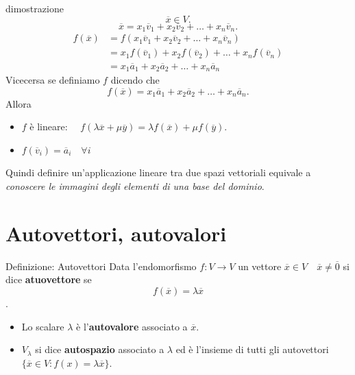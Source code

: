 \documentclass[x11names]{article}
\begin{document}
\begin{es}{dimostrazione}
\[
\overline{x} \in V
.\] 
\[
\overline{x} = x_1 \overline{v}_{1} + x_2\overline{v}_{2} + \dots + x_{n}\overline{v}_{n}
.\] 
\begin{align*}
	f\left(\overline{x}\right) &= f\left(x_1 \overline{v}_{1} + x_2\overline{v}_{2} + \dots + x_{n}\overline{v}_{n}\right) \\
				   &= x_1 f\left(\overline{v}_{1}\right) + x_2 f\left(\overline{v}_{2}\right) + \dots + x_{n}f\left(\overline{v}_{n}\right) \\
				   &= x_1 \overline{a}_{1} + x_2 \overline{a}_{2} + \dots + x_{n} \overline{a}_{n}
\end{align*}
Vicecersa se definiamo $f$ dicendo che 
\[
f\left(\overline{x}\right) = x_1 \overline{a}_{1} + x_2 \overline{a}_{2} + \dots + x_{n} \overline{a}_{n}
.\] 
Allora
\begin{itemize}
	\item $f$ è lineare: $\quad f\left(\lambda \overline{x} + \mu \overline{y}\right) = \lambda f\left(\overline{x}\right) + \mu f\left(\overline{y}\right)$.
	\item $f\left(\overline{v}_{i}\right) = \overline{a}_{i} \quad \forall i$
\end{itemize}
\end{es}


Quindi definire un'applicazione lineare tra due spazi vettoriali equivale a \textit{conoscere le immagini degli elementi di una base del dominio}.


\newpage
\section{Autovettori, autovalori}

\begin{center}
\colorbox{myblue}{\begin{minipage}{5.75in}
\begin{blues}{Definizione: Autovettori}
Data l'endomorfismo $f:V\rightarrow V$ un vettore $\overline{x} \in V \quad \overline{x} \neq \overline{0}$  si dice \textbf{atuovettore} se 
\[
f\left(\overline{x}\right) = \lambda \overline{x}
\].
\begin{itemize}
	\item Lo scalare $\lambda$ è l'\textbf{autovalore} associato a $\overline{x}$.
	\item $V_{\lambda}$ si dice \textbf{autospazio} associato a $\lambda$ ed è l'insieme di tutti gli autovettori $\{\overline{x} \in V: f\left(x\right) = \lambda \overline{x}\}$.
\end{itemize}
\end{blues}
\end{minipage}}        
\end{center}
\end{document}
